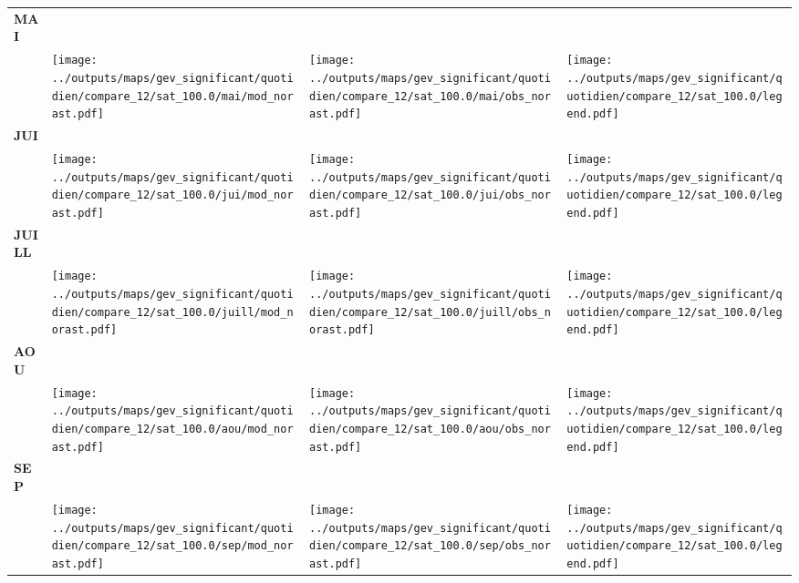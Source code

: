 \documentclass[
  letterpaper,
  DIV=11,
  numbers=noendperiod]{scrartcl}
\begin{document}
\begin{longtable*}{m{2.0cm}m{7.9cm}m{7.9cm}m{1cm}}
\centering \textbf{MAI} \\[0.2em] \begin{tabular}{r@{\hspace{0.2em}}l}\end{tabular} & \centering \texttt{[image: ../outputs/maps/gev\_significant/quotidien/compare\_12/sat\_100.0/mai/mod\_norast.pdf]} & \centering \texttt{[image: ../outputs/maps/gev\_significant/quotidien/compare\_12/sat\_100.0/mai/obs\_norast.pdf]} & \centering \texttt{[image: ../outputs/maps/gev\_significant/quotidien/compare\_12/sat\_100.0/legend.pdf]} \tabularnewline
\centering \textbf{JUI} \\[0.2em] \begin{tabular}{r@{\hspace{0.2em}}l}\end{tabular} & \centering \texttt{[image: ../outputs/maps/gev\_significant/quotidien/compare\_12/sat\_100.0/jui/mod\_norast.pdf]} & \centering \texttt{[image: ../outputs/maps/gev\_significant/quotidien/compare\_12/sat\_100.0/jui/obs\_norast.pdf]} & \centering \texttt{[image: ../outputs/maps/gev\_significant/quotidien/compare\_12/sat\_100.0/legend.pdf]} \tabularnewline
\centering \textbf{JUILL} \\[0.2em] \begin{tabular}{r@{\hspace{0.2em}}l}\end{tabular} & \centering \texttt{[image: ../outputs/maps/gev\_significant/quotidien/compare\_12/sat\_100.0/juill/mod\_norast.pdf]} & \centering \texttt{[image: ../outputs/maps/gev\_significant/quotidien/compare\_12/sat\_100.0/juill/obs\_norast.pdf]} & \centering \texttt{[image: ../outputs/maps/gev\_significant/quotidien/compare\_12/sat\_100.0/legend.pdf]} \tabularnewline
\centering \textbf{AOU} \\[0.2em] \begin{tabular}{r@{\hspace{0.2em}}l}\end{tabular} & \centering \texttt{[image: ../outputs/maps/gev\_significant/quotidien/compare\_12/sat\_100.0/aou/mod\_norast.pdf]} & \centering \texttt{[image: ../outputs/maps/gev\_significant/quotidien/compare\_12/sat\_100.0/aou/obs\_norast.pdf]} & \centering \texttt{[image: ../outputs/maps/gev\_significant/quotidien/compare\_12/sat\_100.0/legend.pdf]} \tabularnewline
\centering \textbf{SEP} \\[0.2em] \begin{tabular}{r@{\hspace{0.2em}}l}\end{tabular} & \centering \texttt{[image: ../outputs/maps/gev\_significant/quotidien/compare\_12/sat\_100.0/sep/mod\_norast.pdf]} & \centering \texttt{[image: ../outputs/maps/gev\_significant/quotidien/compare\_12/sat\_100.0/sep/obs\_norast.pdf]} & \centering \texttt{[image: ../outputs/maps/gev\_significant/quotidien/compare\_12/sat\_100.0/legend.pdf]} \tabularnewline

\end{longtable*}
\end{document}
